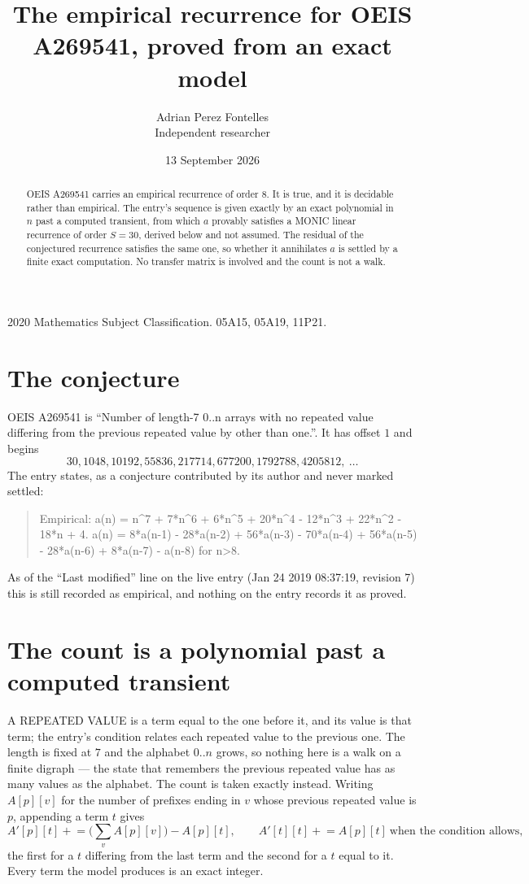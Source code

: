 \documentclass[11pt,a4paper]{article}
\title{The empirical recurrence for OEIS A269541, proved from an exact model}
\author{Adrian Perez Fontelles\\ \small Independent researcher}
\date{13 September 2026}
\theoremstyle{plain}
\theoremstyle{definition}
\begin{document}
\maketitle

\begin{abstract}
OEIS A269541 carries an empirical recurrence of order $8$. It is true, and it is
decidable rather than empirical. The entry's sequence is given exactly by an exact polynomial in $n$ past a computed transient, from
which $a$ provably satisfies a MONIC linear recurrence of order $S=30$, derived below and not
assumed. The residual of the conjectured recurrence satisfies the same one, so whether it
annihilates $a$ is settled by a finite exact computation. No transfer matrix is involved and
the count is not a walk.
\end{abstract}

\noindent\small 2020 Mathematics Subject Classification. 05A15, 05A19, 11P21.\normalsize

\section{The conjecture}

OEIS A269541 is ``Number of length-7 0..n arrays with no repeated value differing from the previous repeated value by other than one.''. It has offset $1$ and begins
\[
30, 1048, 10192, 55836, 217714, 677200, 1792788, 4205812,\ \dots
\]
The entry states, as a conjecture contributed by its author and never marked settled:
\begin{quote}
Empirical: a(n) = n\^{}7 + 7*n\^{}6 + 6*n\^{}5 + 20*n\^{}4 - 12*n\^{}3 + 22*n\^{}2 - 18*n + 4. a(n) = 8*a(n-1) - 28*a(n-2) + 56*a(n-3) - 70*a(n-4) + 56*a(n-5) - 28*a(n-6) + 8*a(n-7) - a(n-8) for n>8.
\end{quote}
As of the ``Last modified'' line on the live entry (Jan 24 2019 08:37:19, revision 7)
this is still recorded as empirical, and nothing on the entry records it as proved.

\section{The count is a polynomial past a computed transient}

A REPEATED VALUE is a term equal to the one before it, and its value is that term; the entry's
condition relates each repeated value to the previous one. The length is fixed at $7$ and the
alphabet $0..n$ grows, so nothing here is a walk on a finite digraph --- the state that
remembers the previous repeated value has as many values as the alphabet. The count is taken
exactly instead. Writing $A[p][v]$ for the number of prefixes ending in $v$ whose previous
repeated value is $p$, appending a term $t$ gives
\[
A'[p][t] \mathrel{+}= \Big(\sum_v A[p][v]\Big) - A[p][t],
\qquad
A'[t][t] \mathrel{+}= A[p][t]\ \text{when the condition allows},
\]
the first for a $t$ differing from the last term and the second for a $t$ equal to it. Every
term the model produces is an exact integer.
\end{document}
